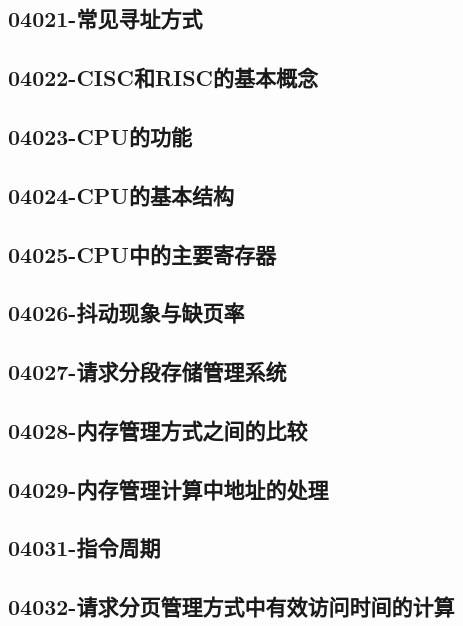 \subsection{04021-常见寻址方式}

\subsection{04022-CISC和RISC的基本概念}

\subsection{04023-CPU的功能}

\subsection{04024-CPU的基本结构}

\subsection{04025-CPU中的主要寄存器}

\subsection{04026-抖动现象与缺页率}

\subsection{04027-请求分段存储管理系统}

\subsection{04028-内存管理方式之间的比较}

\subsection{04029-内存管理计算中地址的处理}

\subsection{04031-指令周期}

\subsection{04032-请求分页管理方式中有效访问时间的计算}

